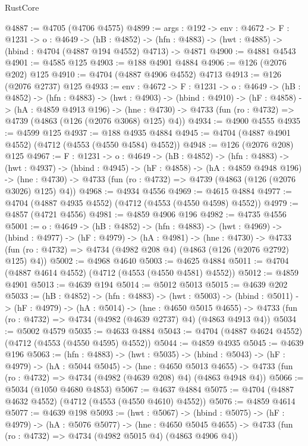 \begin{lexlean}{RustCore}
\begin{coremodule}
@4887 := @4705 (@4706 @4575)
@4899 := {args : @192} ->
  {env : @4672} ->
  {F : @1231} ->
  {o : @4649} ->
  (hB : @4852) ->
  (hfn : @4883) -> (hwt : @4885) -> (hbind : @4704 (@4887 @194 @4552) @4713) -> @4871
@4900 := @4881 @4543
@4901 := @4585 @125
@4903 := @188 @4901 @4884
@4906 := @126 (@2076 @202) @125
@4910 := @4704 (@4887 @4906 @4552) @4713
@4913 := @126 (@2076 @2737) @125
@4933 := {env : @4672} ->
  {F : @1231} ->
  {o : @4649} ->
  (hB : @4852) ->
  (hfn : @4883) ->
  (hwt : @4903) ->
  (hbind : @4910) ->
  (hF : @4858) ->
  (hA : @4859 @4913 @196) ->
  (hne : @4730) -> @4733 (fun (ro : @4732) => @4739 (@4863 (@126 (@2076 @3068) @125) @4))
@4934 := @4900 @4555
@4935 := @4599 @125
@4937 := @188 @4935 @4884
@4945 := @4704 (@4887 @4901 @4552) (@4712 (@4553 (@4550 @4584) @4552))
@4948 := @126 (@2076 @208) @125
@4967 := {F : @1231} ->
  {o : @4649} ->
  (hB : @4852) ->
  (hfn : @4883) ->
  (hwt : @4937) ->
  (hbind : @4945) ->
  (hF : @4858) ->
  (hA : @4859 @4948 @196) ->
  (hne : @4730) -> @4733 (fun (ro : @4732) => @4739 (@4863 (@126 (@2076 @3026) @125) @4))
@4968 := @4934 @4556
@4969 := @4615 @4884
@4977 := @4704 (@4887 @4935 @4552) (@4712 (@4553 (@4550 @4598) @4552))
@4979 := @4857 (@4721 @4556)
@4981 := @4859 @4906 @196
@4982 := @4735 @4556
@5001 := {o : @4649} ->
  (hB : @4852) ->
  (hfn : @4883) ->
  (hwt : @4969) ->
  (hbind : @4977) ->
  (hF : @4979) ->
  (hA : @4981) ->
  (hne : @4730) ->
  @4733 (fun (ro : @4732) => @4734 (@4982 @208 @4) (@4863 (@126 (@2076 @2792) @125) @4))
@5002 := @4968 @4640
@5003 := @4625 @4884
@5011 := @4704 (@4887 @4614 @4552) (@4712 (@4553 (@4550 @4581) @4552))
@5012 := @4859 @4901
@5013 := @4639 @194
@5014 := @5012 @5013
@5015 := @4639 @202
@5033 := (hB : @4852) ->
  (hfn : @4883) ->
  (hwt : @5003) ->
  (hbind : @5011) ->
  (hF : @4979) ->
  (hA : @5014) ->
  (hne : @4650 @5015 @4655) ->
  @4733 (fun (ro : @4732) => @4734 (@4982 (@4639 @2737) @4) (@4863 @4913 @4))
@5034 := @5002 @4579
@5035 := @4633 @4884
@5043 := @4704 (@4887 @4624 @4552) (@4712 (@4553 (@4550 @4595) @4552))
@5044 := @4859 @4935
@5045 := @4639 @196
@5063 := (hfn : @4883) ->
  (hwt : @5035) ->
  (hbind : @5043) ->
  (hF : @4979) ->
  (hA : @5044 @5045) ->
  (hne : @4650 @5013 @4655) ->
  @4733 (fun (ro : @4732) => @4734 (@4982 (@4639 @208) @4) (@4863 @4948 @4))
@5066 := @5034 (@1050 @4680 @4853)
@5067 := @4637 @4884
@5075 := @4704 (@4887 @4632 @4552) (@4712 (@4553 (@4550 @4610) @4552))
@5076 := @4859 @4614
@5077 := @4639 @198
@5093 := (hwt : @5067) ->
  (hbind : @5075) ->
  (hF : @4979) ->
  (hA : @5076 @5077) ->
  (hne : @4650 @5045 @4655) -> @4733 (fun (ro : @4732) => @4734 (@4982 @5015 @4) (@4863 @4906 @4))

\end{coremodule}
\end{lexlean}
